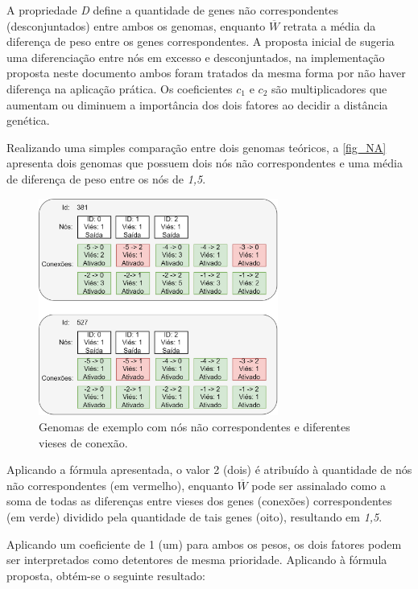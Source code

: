 A propriedade \textit{D} define a quantidade de genes não correspondentes
(desconjuntados) entre ambos os genomas, enquanto $\overline{W}$ retrata
a média da diferença de peso entre os genes correspondentes. A proposta inicial
de  sugeria uma diferenciação entre nós em excesso e
desconjuntados, na implementação proposta neste documento ambos foram tratados da
mesma forma por não haver diferença na aplicação prática. Os coeficientes $c_1$
e $c_2$ são multiplicadores que aumentam ou diminuem a importância dos dois fatores
ao decidir a distância genética.

Realizando uma simples comparação entre dois genomas teóricos, a \autoref{fig_NA} apresenta
dois genomas que possuem dois nós não correspondentes e uma média de diferença de peso entre os nós de \textit{1,5}.

\begin{figure}[htb]
        \centering
        \caption{\label{fig_NA}Genomas de exemplo com nós não correspondentes e diferentes vieses de conexão.}
        \includegraphics[width=0.7\textwidth]{images/NA.png}
\end{figure}

Aplicando a fórmula apresentada, o valor 2 (dois) é atribuído à quantidade
de nós não correspondentes (em vermelho), enquanto $\overline{W}$ pode ser
assinalado como a soma de todas as diferenças entre vieses dos genes (conexões)
correspondentes (em verde) dividido pela quantidade de tais genes (oito), resultando em \textit{1,5}.

Aplicando um coeficiente de 1 (um) para ambos os pesos, os dois fatores podem ser
interpretados como detentores de mesma prioridade. Aplicando à fórmula proposta, obtém-se o seguinte resultado:

